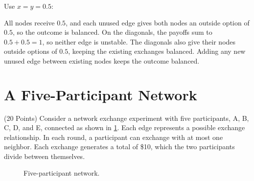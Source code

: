 \documentclass[newpages]{assignment}
\begin{document}
\begin{solution}
    Use \(x=y=0.5\):

    \begin{figure}[H]
        \centering
    \end{figure}

    All nodes receive \(0.5\), and each unused edge gives both nodes an outside option of \(0.5\), so the outcome is balanced. On the diagonals, the payoffs sum to \(0.5+0.5=1\), so neither edge is unstable. The diagonals also give their nodes outside options of \(0.5\), keeping the existing exchanges balanced. Adding any new unused edge between existing nodes keeps the outcome balanced.
\end{solution}

\section{A Five-Participant Network}

\begin{problem}
    (20 Points) Consider a network exchange experiment with five participants, A, B, C, D, and E, connected as shown in \cref{fig:hw7-path}. Each edge represents a possible exchange relationship. In each round, a participant can exchange with at most one neighbor. Each exchange generates a total of \$10, which the two participants divide between themselves.

    \begin{figure}[H]
        \centering
        \caption{Five-participant network.}
        \label{fig:hw7-path}
    \end{figure}
\end{problem}
\end{document}
